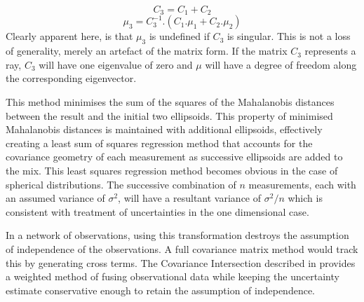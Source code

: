 \documentclass{article}
\newcounter{subsubsubsection}[subsubsection]
\begin{document}
        \begin{equation}
        C_3 = C_1+C_2
        \end{equation}
        \begin{equation}
        \mu_3 = C_3^{-1} . (C_1.\mu_1 + C_2.\mu_2)
        \end{equation}
        Clearly apparent here, is that \(\mu_3\) is undefined if \(C_3\) is singular.
        This is not a loss of generality, merely an artefact of the matrix form.  If the matrix \(C_3\) represents a ray, \(C_3\)  will have one eigenvalue of zero and \(\mu\) will have a degree of freedom along the corresponding eigenvector.
        
        This method minimises the sum of the squares of the Mahalanobis distances between the result and the initial two ellipsoids.  This property of minimised Mahalanobis distances is maintained with additional ellipsoids, effectively creating a least sum of squares regression method that accounts for the covariance geometry of each measurement as successive ellipsoids are added to the mix.
        This least squares regression method becomes obvious in the case of spherical distributions.  The successive combination of \(n\) measurements, each with an assumed variance of \(\sigma^2\), will have a resultant variance of \(\sigma^2/n\) which is consistent with treatment of uncertainties in the one dimensional case.

        In a network of observations, using this transformation destroys the assumption of independence of the observations.  A full covariance matrix method would track this by generating cross terms.  The Covariance Intersection described in \cite{CovarNoCorrel} provides a weighted method of fusing observational data while keeping the uncertainty estimate conservative enough to retain the assumption of independence.

      
\end{document}
